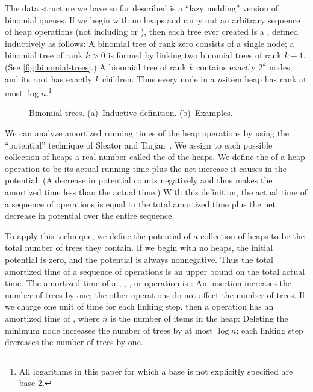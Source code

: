 The data structure we have so far described is a ``lazy melding'' version of binomial
queues. If we begin with no heaps and carry out an arbitrary sequence of heap
operations (not including  or ), then each tree ever
created is a , defined inductively as follows: A binomial tree of
rank zero consists of a single node; a binomial tree of rank \(k > 0\) is formed by
linking two binomial trees of rank \(k - 1\). (See \autoref{fig:binomial-trees}.)
A binomial tree of rank \(k\) contains exactly \(2^k\) nodes, and its root has
exactly \(k\) children. Thus every node in a \(n\)-item heap has rank at most \(\log
n\).\footnote{All logarithms in this paper for which a base is not explicitly
specified are base 2.}

\begin{figure}
    \caption{Binomial trees. (a)~Inductive definition. (b)~Examples.}
    \label{fig:binomial-trees}
\end{figure}

We can analyze amortized running times of the heap operations by using the
``potential'' technique of Sleator and Tarjan~\cite{SleatorTarjan1986,Tarjan1985}. We
assign to each possible collection of heaps a real number called the 
of the heaps. We define the  of a heap operation to be its
actual running time plus the net increase it causes in the potential. (A decrease in
potential counts negatively and thus makes the amortized time less than the actual
time.) With this definition, the actual time of a sequence of operations is equal to
the total amortized time plus the net decrease in potential over the entire sequence.

To apply this technique, we define the potential of a collection of heaps to be the
total number of trees they contain. If we begin with no heaps, the initial potential
is zero, and the potential is always nonnegative. Thus the total amortized time of
a sequence of operations is an upper bound on the total actual time. The amortized
time of a , , , or  operation is
: An insertion increases the number of trees by one; the other operations do
not affect the number of trees. If we charge one unit of time for each linking step,
then a  operation has an amortized time of , where \(n\)
is the number of items in the heap: Deleting the minimum node increases the number of
trees by at most \(\log n\); each linking step decreases the number of trees by one.

